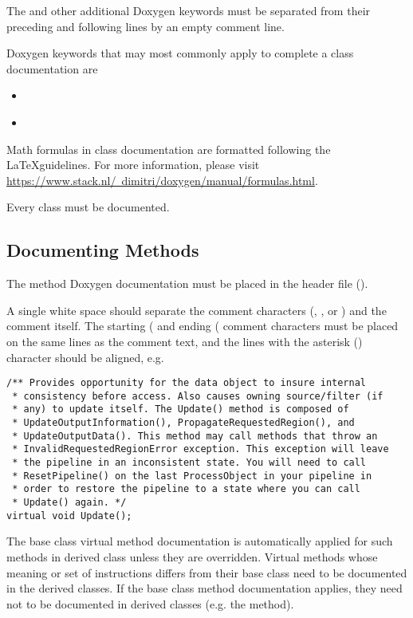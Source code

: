 The  and other additional Doxygen keywords must be separated from
their preceding and following lines by an empty comment \code{*} line.

Doxygen keywords that may most commonly apply to complete a class documentation are
\begin{itemize}
  \item \textbf{}
  \item \textbf{}
\end{itemize}

Math formulas in class documentation are formatted following the \LaTeX guidelines.
For more information, please visit
\href{https://www.stack.nl/~dimitri/doxygen/manual/formulas.html}
{https://www.stack.nl/~dimitri/doxygen/manual/formulas.html}.

Every class must be documented.


\subsection{Documenting Methods}
\label{subsec:DocumentingMethods}

The method Doxygen documentation must be placed in the header file ().

A single white space should separate the comment characters (\code{/**},
\code{*}, or \code{*/}) and the comment itself. The starting (\code{/**}
and ending (\code{*/} comment characters must be placed on the same lines
as the comment text, and the lines with the asterisk (\code{*}) character
should be aligned, e.g.

\small
\begin{verbatim}
/** Provides opportunity for the data object to insure internal
 * consistency before access. Also causes owning source/filter (if
 * any) to update itself. The Update() method is composed of
 * UpdateOutputInformation(), PropagateRequestedRegion(), and
 * UpdateOutputData(). This method may call methods that throw an
 * InvalidRequestedRegionError exception. This exception will leave
 * the pipeline in an inconsistent state. You will need to call
 * ResetPipeline() on the last ProcessObject in your pipeline in
 * order to restore the pipeline to a state where you can call
 * Update() again. */
virtual void Update();
\end{verbatim}
\normalsize

The base class virtual method documentation is automatically applied for such
methods in derived class unless they are overridden. Virtual methods whose
meaning or set of instructions differs from their base class need to be
documented in the derived classes. If the base class method documentation
applies, they need not to be documented in derived classes (e.g. the
 method).

